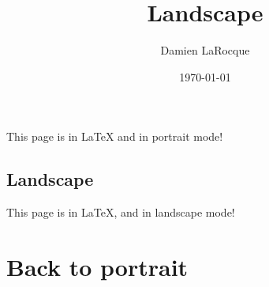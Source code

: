 \documentclass[12pt]{article}
\title{Landscape}
\author{Damien LaRocque}
\date{\today}
\begin{document}
\maketitle

This page is in \LaTeX{} and in portrait mode!

\lipsum[1-2]

\begin{landscape}
    \section{Landscape}

    This page is in \LaTeX, and in landscape mode!

    \lipsum[3-5]
\end{landscape}

\section{Back to portrait}

\lipsum[42-44]
\end{document}
